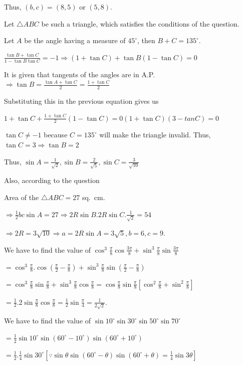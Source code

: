   Thus, $(b, c) = (8, 5)$ or $(5, 8)$.
\item Let $\triangle ABC$ be such a triangle, which satisfies the conditions of the question.

  Let $A$ be the angle having a measure of $45^\circ$, then $B + C = 135^\circ$.

  $\frac{\tan B + \tan C}{1 - \tan B\tan C} = -1 \Rightarrow (1 + \tan C) + \tan B(1 - \tan C) = 0$

  It is given that tangents of the angles are in A.P. $\Rightarrow \tan B = \frac{\tan A + \tan C}{2}
  = \frac{1 + \tan C}{2}$

  Substituting this in the previous equation gives us

  $1 + \tan C + \frac{1 + \tan C}{2}(1 - \tan C) = 0 (1 + \tan C)(3 - tan C) = 0$

  $\tan C\neq -1$ because $C = 135^\circ$ will make the triangle invalid. Thus, $\tan C = 3 \Rightarrow \tan
  B = 2$

  Thus, $\sin A = \frac{1}{\sqrt{2}}, \sin B = \frac{2}{\sqrt{5}}, \sin C = \frac{3}{\sqrt{10}}$

  Also, according to the question

  Area of the $\triangle ABC = 27$ sq.\ cm.

  $\Rightarrow \frac{1}{2}bc\sin A = 27 \Rightarrow 2R\sin B.2R\sin C.\frac{1}{\sqrt{2}} = 54$

  $\Rightarrow 2R = 3\sqrt{10}\Rightarrow a = 2R\sin A = 3\sqrt{5}, b = 6, c = 9$.
\item We have to find the value of $\cos^3\frac{\pi}{8}\cos\frac{3\pi}{8}
  + \sin^3\frac{\pi}{8}\sin\frac{3\pi}{8}$

  $= \cos^3\frac{\pi}{8}.\cos\left(\frac{\pi}{2} - \frac{\pi}{8}\right)
  + \sin^3\frac{\pi}{8}\sin\left(\frac{\pi}{2} - \frac{\pi}{8}\right)$

  $= \cos^3\frac{\pi}{8}\sin\frac{\pi}{8} + \sin^3\frac{\pi}{8}\cos\frac{\pi}{8}
  = \cos\frac{\pi}{8}\sin\frac{\pi}{8}\left[\cos^2\frac{\pi}{8} + \sin^2\frac{\pi}{8}\right]$

  $= \frac{1}{2}.2\sin\frac{\pi}{8}\cos\frac{\pi}{8} = \frac{1}{2}\sin\frac{\pi}{4} = \frac{1}{2\sqrt{2}}$.
\item We have to find the value of $\sin10^\circ\sin30^\circ\sin50^\circ\sin70^\circ$

  $= \frac{1}{2}\sin10^\circ\sin\left(60^\circ - 10^\circ\right)\sin\left(60^\circ + 10^\circ\right)$

  $= \frac{1}{2}.\frac{1}{4}\sin30^\circ\left[\because \sin\theta\sin\left(60^\circ
  - \theta\right)\sin\left(60^\circ + \theta\right) = \frac{1}{4}\sin3\theta\right]$

